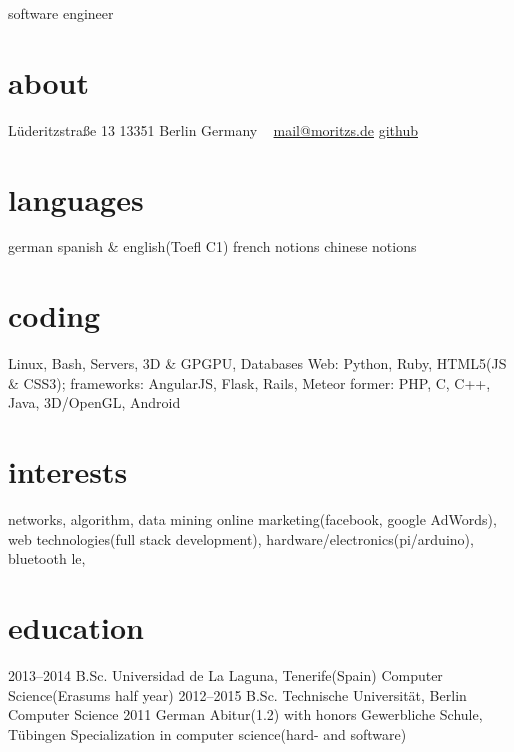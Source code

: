 \documentclass[]{friggeri-cv}
\begin{document}
       {software engineer}


\begin{aside}
  \section{about}
    Lüderitzstraße 13
    13351 Berlin
    Germany
    ~
    \href{mailto:mail@moritz.de}{mail@moritzs.de}
    \href{https://github.com/moritzschaefer}{github}
  \section{languages}
    german
    spanish \&  english(Toefl C1)
    french notions
    chinese notions
  \section{coding}
    Linux, Bash, Servers, 3D \& GPGPU, Databases
    Web:
    Python, Ruby,
    HTML5(JS \& CSS3); frameworks: AngularJS, Flask, Rails, Meteor
    former:
    PHP, C, C++, Java, 3D/OpenGL, Android
\end{aside}

\section{interests}

networks, algorithm, data mining
online marketing(facebook, google AdWords),
web technologies(full stack development),
hardware/electronics(pi/arduino), bluetooth le,

\section{education}

\begin{entrylist}
  \entry
    {2013–2014}
    {B.Sc.}
    {Universidad de La Laguna, Tenerife(Spain)}
    {Computer Science(Erasums half year)}
  \entry
    {2012–2015}
    {B.Sc.}
    {Technische Universität, Berlin}
    {Computer Science}
  \entry
    {2011}
    {German Abitur(1.2) with honors}
    {Gewerbliche Schule, Tübingen}
    {Specialization in computer science(hard- and software)}
\end{entrylist}
\end{document}
